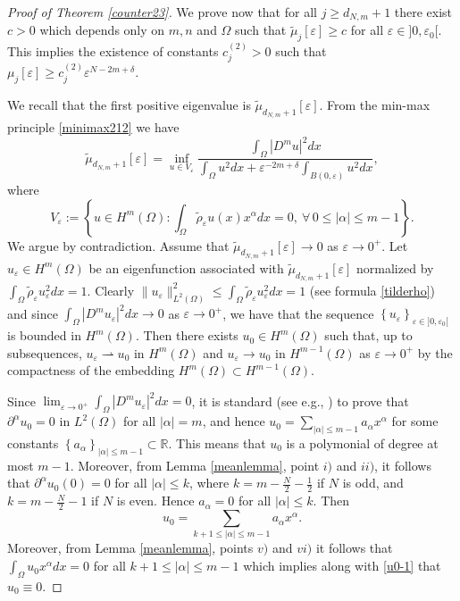 \documentclass[11pt,a4paper]{amsart}
\numberwithin{equation}{section}
\begin{document}
\begin{proof}[Proof of Theorem \ref{counter23}]
We prove now that for all $j\geq d_{N,m}+1$ there exist $c>0$ which depends only on $m,n$ and $\Omega$ such that $\tilde\mu_j[\varepsilon]\geq c$ for all $\varepsilon\in]0,\varepsilon_0[$. This implies the existence of constants $c_j^{(2)}>0$ such that $\mu_j[\varepsilon]\geq c_j^{(2)}\varepsilon^{N-2m+\delta}$.

We recall that the first positive eigenvalue is $\tilde\mu_{d_{N,m}+1}[\varepsilon]$. From the min-max principle \eqref{minimax212} we have
\begin{equation*}%
\tilde\mu_{d_{N,m}+1}[\varepsilon]=\inf_{u\in V_{\varepsilon}}\frac{\int_{\Omega}|D^mu|^2dx}{\int_{\Omega}u^2dx+\varepsilon^{-2m+\delta}\int_{B(0,\varepsilon)}u^2dx},
\end{equation*}
where 
$$
V_{\varepsilon}:=\left\{u\in H^m(\Omega):\int_{\Omega}\tilde\rho_{\varepsilon}u(x)x^{\alpha}dx=0,\ \forall\,0\leq|\alpha|\leq m-1\right\}.
$$
We argue by contradiction. Assume that $\tilde\mu_{d_{N,m}+1}[\varepsilon]\rightarrow 0$ as $\varepsilon\rightarrow 0^+$. Let $u_{\varepsilon}\in H^m(\Omega)$ be an eigenfunction associated with $\tilde\mu_{d_{N,m}+1}[\varepsilon]$ normalized by $\int_{\Omega}\tilde\rho_{\varepsilon}u_{\varepsilon}^2dx=1$. Clearly $\|u_{\varepsilon}\|_{L^2(\Omega)}^2\leq\int_{\Omega}\tilde\rho_{\varepsilon}u_{\varepsilon}^2dx= 1$ (see formula \eqref{tilderho}) and since $\int_{\Omega}|D^mu_{\varepsilon}|^2dx\rightarrow 0$ as $\varepsilon\rightarrow 0^+$, we have that the sequence $\left\{u_{\varepsilon}\right\}_{\varepsilon\in]0,\varepsilon_0[}$ is bounded in $H^m(\Omega)$. Then there exists $u_0\in H^m(\Omega)$ such that, up to subsequences, $u_{\varepsilon}\rightharpoonup u_0$ in $H^m(\Omega)$ and $u_{\varepsilon}\rightarrow u_0$ in $H^{m-1}(\Omega)$ as $\varepsilon\rightarrow 0^+$ by the compactness of the embedding $H^m(\Omega)\subset H^{m-1}(\Omega)$.

Since $\lim_{\varepsilon\rightarrow 0^+}\int_{\Omega}|D^m u_{\varepsilon}|^2dx=0$, it is standard  (see e.g., \cite[\S\,5.8]{evans}) to prove that ${\partial^{\alpha} u_0}=0$ in $L^2(\Omega)$ for all $|\alpha|=m$, and hence $u_0=\sum_{|\alpha|\leq m-1}a_{\alpha}x^{\alpha}$ for some constants $\left\{a_{\alpha}\right\}_{|\alpha|\leq m-1}\subset\mathbb R$. This means that $u_0$ is a polymonial of degree at most $m-1$. Moreover, from Lemma \ref{meanlemma}, point $i)$ and $ii)$, it follows that $\partial^{\alpha}u_0(0)=0$ for all $|\alpha|\leq k$, where $k=m-\frac{N}{2}-\frac{1}{2}$ if $N$ is odd, and $k=m-\frac{N}{2}-1$ if $N$ is even. Hence $a_{\alpha}=0$ for all $|\alpha|\leq k$. Then 
\begin{equation}\label{u0-1}
u_0=\sum_{k+1\leq|\alpha|\leq m-1}a_{\alpha}x^{\alpha}.
\end{equation}
Moreover, from Lemma \ref{meanlemma}, points $v)$ and $vi)$ it follows that $\int_{\Omega}u_0x^{\alpha}dx=0$ for all $k+1\leq|\alpha|\leq m-1$ which implies along with \eqref{u0-1} that $u_0\equiv 0$.


\end{proof}
\end{document}
